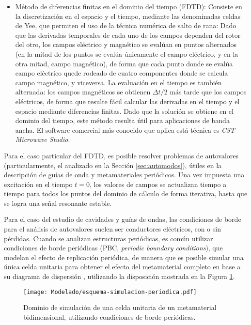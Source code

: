 \begin{itemize}
	\item Método de diferencias finitas en el dominio del tiempo (FDTD): Consiste en la discretización en el espacio y el tiempo, mediante las denominadas celdas de Yee, que permiten el uso de la técnica numérica de salto de rana: Dado que las derivadas temporales de cada uno de los campos dependen del rotor del otro, los campos eléctrico y magnético se evalúan en puntos alternados (en la mitad de los puntos se evalúa únicamente el campo eléctrico, y en la otra mitad, campo magnético), de forma que cada punto donde se evalúa campo eléctrico quede rodeado de cuatro componentes donde se calcula campo magnético, y viceversa. La evaluación en el tiempo es también alternada: los campos magnéticos se obtienen $\Delta t/2$ más tarde que los campos eléctricos, de forma que resulte fácil calcular las derivadas en el tiempo y el espacio mediante diferencias finitas. Dado que la solución se obtiene en el dominio del tiempo, este método resulta útil para aplicaciones de banda ancha. El software comercial más conocido que aplica está técnica es \textit{CST Microwave Studio}.
\end{itemize}

Para el caso particular del FDTD, es posible resolver problemas de autovalores (particularmente, el analizado en la Sección \ref{sec:automodos}), útiles en la descripción de guías de onda y metamateriales periódicos. Una vez impuesta una excitación en el tiempo $t=0$, los valores de campos se actualizan tiempo a tiempo para todos los puntos del dominio de cálculo de forma iterativa, hasta que se logra una señal resonante estable.

Para el caso del estudio de cavidades y guías de ondas, las condiciones de borde para el análisis de autovalores suelen ser conductores eléctricos, con o sin pérdidas. Cuando se analizan estructuras periódicas, es común utilizar condiciones de borde periódicas (PBC, \textit{periodic boundary conditions}), que modelan el efecto de replicación periódica, de manera que es posible simular una única celda unitaria para obtener el efecto del metamaterial completo en base a su diagrama de dispersión \cite{Yang:EBGAntennas}, utilizando la disposición mostrada en la Figura \ref{fig:esquema-simulacion-periodica}.

\begin{figure}[h]
	\centering
	\texttt{[image: Modelado/esquema-simulacion-periodica.pdf]}
	\caption{Dominio de simulación de una celda unitaria de un metamaterial bidimensional, utilizando condiciones de borde periódicas.}
	\label{fig:esquema-simulacion-periodica}
\end{figure}


